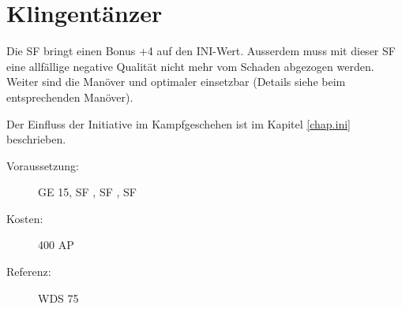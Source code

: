 \section{Klingentänzer}
\label{sf.klingentaenzer}
Die SF  bringt einen Bonus +4 auf den INI-Wert.
Ausserdem muss mit dieser SF eine allfällige negative Qualität nicht mehr vom Schaden abgezogen werden.
Weiter sind die Manöver  und  optimaler einsetzbar (Details siehe beim entsprechenden Manöver).

Der Einfluss der Initiative im Kampfgeschehen ist im Kapitel \ref{chap.ini} beschrieben.
\begin{description}
    \item[Voraussetzung:]
        GE 15, SF , SF , SF 
    \item [Kosten:]
        400 AP
    \item [Referenz:]
        WDS 75
\end{description}
